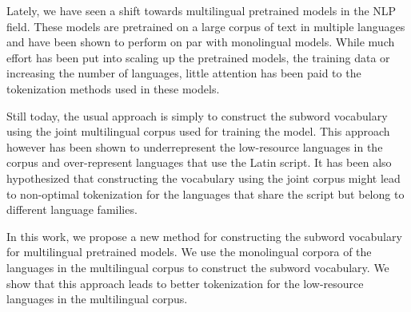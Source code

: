 Lately, we have seen a shift towards multilingual pretrained models in the NLP field. These models are pretrained on a large corpus of text in multiple languages and have been shown to perform on par with monolingual models. While much effort has been put into scaling up the pretrained models, the training data or increasing the number of languages, little attention has been paid to the tokenization methods used in these models.

Still today, the usual approach is simply to construct the subword vocabulary using the joint multilingual corpus used for training the model. This approach however has been shown to underrepresent the low-resource languages in the corpus and over-represent languages that use the Latin script. It has been also hypothesized that constructing the vocabulary using the joint corpus might lead to non-optimal tokenization for the languages that share the script but belong to different language families.

In this work, we propose a new method for constructing the subword vocabulary for multilingual pretrained models. We use the monolingual corpora of the languages in the multilingual corpus to construct the subword vocabulary. We show that this approach leads to better tokenization for the low-resource languages in the multilingual corpus.